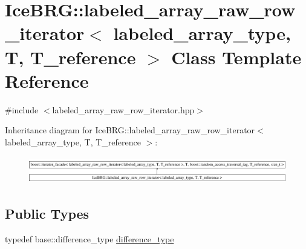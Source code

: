 \hypertarget{classIceBRG_1_1labeled__array__raw__row__iterator}{}\section{Ice\+B\+R\+G\+:\+:labeled\+\_\+array\+\_\+raw\+\_\+row\+\_\+iterator$<$ labeled\+\_\+array\+\_\+type, T, T\+\_\+reference $>$ Class Template Reference}
\label{classIceBRG_1_1labeled__array__raw__row__iterator}


{\ttfamily \#include $<$labeled\+\_\+array\+\_\+raw\+\_\+row\+\_\+iterator.\+hpp$>$}

Inheritance diagram for Ice\+B\+R\+G\+:\+:labeled\+\_\+array\+\_\+raw\+\_\+row\+\_\+iterator$<$ labeled\+\_\+array\+\_\+type, T, T\+\_\+reference $>$\+:\begin{figure}[H]
\begin{center}
\leavevmode
\includegraphics[height=1.206897cm]{classIceBRG_1_1labeled__array__raw__row__iterator}
\end{center}
\end{figure}
\subsection*{Public Types}
\begin{DoxyCompactItemize}
\item 
typedef base\+::difference\+\_\+type \hyperlink{classIceBRG_1_1labeled__array__raw__row__iterator_af87be9b30e0d95c012db53c65365c3dd}{difference\+\_\+type}
\end{DoxyCompactItemize}
